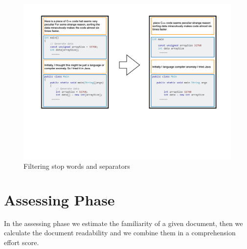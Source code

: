 \documentclass[12pt,mscthesis]{usiinfthesis}
\begin{document}
	\begin{figure}[htbp]
	\centering
	\includegraphics[width=\textwidth]{FilterLM}
	\caption{Filtering stop words and separators}
	\label{FilterLM}
	\end{figure}

	\newpage

	\section{Assessing Phase}

	In the assessing phase we estimate the familiarity of a given document, then we calculate the document readability and we combine them in a comprehension effort score.
\end{document}
